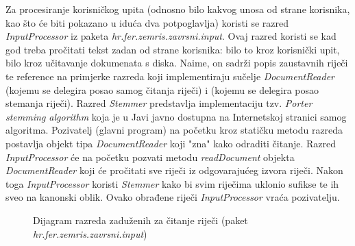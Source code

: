 \documentclass[times, utf8, zavrsni]{fer}
\begin{document}
Za procesiranje korisničkog upita (odnosno bilo kakvog unosa od strane korisnika, kao što će biti pokazano u iduća dva potpoglavlja) koristi se razred \textit{InputProcessor} iz paketa \textit{hr.fer.zemris.zavrsni.input}. Ovaj razred koristi se kad god treba pročitati tekst zadan od strane korisnika: bilo to kroz korisnički upit, bilo kroz učitavanje dokumenata s diska. Naime, on sadrži popis zaustavnih riječi te reference na primjerke razreda koji implementiraju sučelje \textit{DocumentReader} (kojemu se delegira posao samog čitanja riječi) i  (kojemu se delegira posao stemanja riječi). Razred \textit{Stemmer} predstavlja implementaciju tzv. \textit{Porter stemming algorithm} koja je u Javi javno dostupna na Internetskoj stranici samog algoritma.
Pozivatelj (glavni program) na početku kroz statičku metodu razreda postavlja objekt tipa \textit{DocumentReader} koji "zna" kako odraditi čitanje. Razred \textit{InputProcessor} će na početku pozvati metodu \textit{readDocument} objekta \textit{DocumentReader} koji će pročitati sve riječi iz odgovarajućeg izvora riječi. Nakon toga \textit{InputProcessor} koristi \textit{Stemmer} kako bi svim riječima uklonio sufikse te ih sveo na kanonski oblik. Ovako obrađene riječi \textit{InputProcessor} vraća pozivatelju.
\begin{figure}
\caption{Dijagram razreda zaduženih za čitanje riječi (paket \textit{hr.fer.zemris.zavrsni.input})}
\label{img:diagram}
\end{figure}
\end{document}
